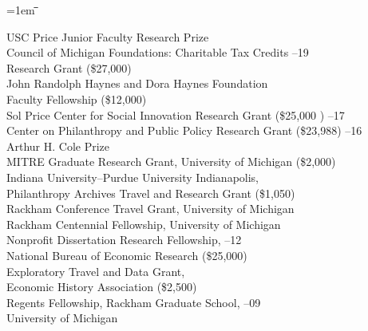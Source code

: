 \documentclass[12pt]{article}
\newlength{\midlength}
\newlength{\firstlength}
\newlength{\listindent}
\newlength{\dategap}
\newlength{\wrapgap}
\newenvironment{datetabbing}{
	\begin{tabbing}
	\parskip=1em
	\hspace*{\listindent}\=\hspace*{\firstlength}\=\hspace*{\midlength}\= \kill
}{
	\end{tabbing}
}
\begin{document}
\begin{datetabbing}
\>	USC Price Junior Faculty Research Prize								\> \>		2019		\'	\\[\dategap]
\>  Council of Michigan Foundations: Charitable Tax Credits				\> --19	\'	\\[\wrapgap]
\>\>		Research Grant (\$27,000)									\>							\\[\dategap]
\>  John Randolph Haynes and Dora Haynes Foundation						\>\>		2018		\' 	\\[\wrapgap]
\>\>		Faculty Fellowship (\$12,000)								\>							\\[\dategap]
\>	Sol Price Center for Social Innovation Research Grant (\$25,000	)	\>--17	\' 	\\[\dategap]
\>	Center on Philanthropy and Public Policy Research Grant (\$23,988)	\>--16	\' 	\\[\dategap]
\>	Arthur H. Cole Prize													\>		\' 	\\[\dategap]
\>	MITRE Graduate Research Grant, University of Michigan (\$2,000)		\>		\' 	\\[\dategap]
\>	Indiana University--Purdue University Indianapolis, 					\>\>		2012		\' 	\\[\wrapgap]
\>\>		Philanthropy Archives Travel and Research Grant	(\$1,050)	\>							\\[\dategap]
\>	Rackham Conference Travel Grant, University of Michigan				\>		\' 	\\[\dategap]
\>	Rackham Centennial Fellowship, University of Michigan				\>		\' 	\\[\dategap]
\>	Nonprofit Dissertation Research Fellowship, 							\>\>		2011--12	\' 	\\[\wrapgap]
\>\>		National Bureau of Economic Research (\$25,000)				\>					 		\\[\dategap]
\>	Exploratory Travel and Data Grant, 									\>		\' 	\\[\wrapgap]
\>\>		Economic History Association (\$2,500)						\>							\\[\dategap]
\>	Regents Fellowship, Rackham Graduate School, 						\>\>		2008--09	\' 	\\[\wrapgap]
\>\>		University of Michigan 										\>							%
\end{datetabbing}																					


\end{document}

